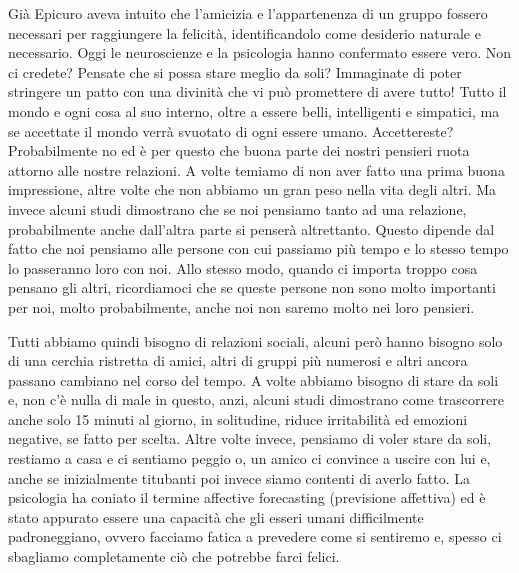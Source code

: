 \documentclass[12pt]{book} %
\begin{document}
Già Epicuro aveva intuito che l'amicizia e l'appartenenza di un gruppo fossero
necessari per raggiungere la felicità, identificandolo come desiderio naturale e necessario. Oggi le neuroscienze e la
psicologia hanno confermato essere vero. Non ci credete? Pensate che si possa stare meglio da soli? Immaginate di poter
stringere un patto con una divinità che vi può promettere di avere tutto! Tutto il mondo e ogni cosa al suo interno,
oltre a essere belli, intelligenti e simpatici, ma se accettate il mondo verrà svuotato di ogni essere umano.
Accettereste? Probabilmente no ed è per questo che buona parte dei nostri pensieri ruota attorno alle nostre relazioni.
A volte temiamo di non aver fatto una prima buona impressione, altre volte che non abbiamo un gran peso nella vita
degli altri. Ma invece alcuni studi dimostrano che se noi pensiamo tanto ad una relazione, probabilmente anche
dall'altra parte si penserà altrettanto. Questo dipende dal fatto che noi pensiamo alle persone
con cui passiamo più tempo e lo stesso tempo lo passeranno loro con noi. Allo stesso modo, quando ci importa troppo
cosa pensano gli altri, ricordiamoci che se queste persone non sono molto importanti per noi, molto probabilmente,
anche noi non saremo molto nei loro pensieri.


\bigskip

Tutti abbiamo quindi bisogno di relazioni sociali, alcuni però hanno bisogno solo di una cerchia ristretta di amici,
altri di gruppi più numerosi e altri ancora passano cambiano nel corso del tempo. A volte abbiamo bisogno di stare da
soli e, non c'è nulla di male in questo, anzi, alcuni studi dimostrano come trascorrere anche solo
15 minuti al giorno, in solitudine, riduce irritabilità ed emozioni negative, se fatto per scelta. Altre volte invece,
pensiamo di voler stare da soli, restiamo a casa e ci sentiamo peggio o, un amico ci convince a uscire con lui e, anche
se inizialmente titubanti poi invece siamo contenti di averlo fatto. La psicologia ha coniato il termine affective
forecasting (previsione affettiva) ed è stato appurato essere una capacità che gli esseri umani difficilmente
padroneggiano, ovvero facciamo fatica a prevedere come si sentiremo e, spesso ci sbagliamo completamente ciò che
potrebbe farci felici.


\bigskip
\end{document}
